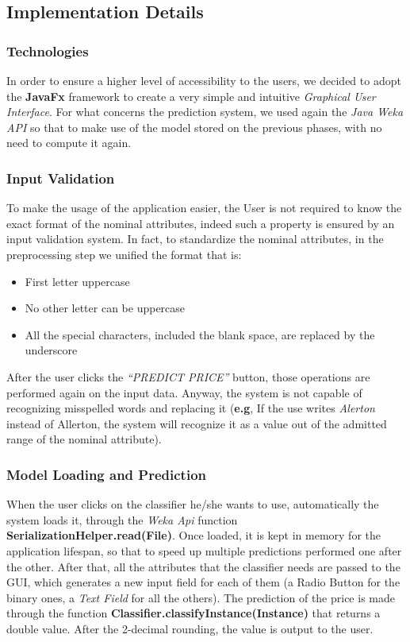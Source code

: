 \subsection{Implementation Details}
\subsubsection{Technologies}
In order to ensure a higher level of accessibility to the users, we decided to adopt the \textbf{JavaFx} framework to create a very simple and intuitive \textit{Graphical User Interface}. 
For what concerns the prediction system, we used again the \textit{Java Weka API} so that to make use of the model stored on the previous phases, with no need to compute it again.

\subsubsection{Input Validation}
To make the usage of the application easier, the User is not required to know the exact format of the nominal attributes, indeed such a property is ensured by an input validation system.
In fact, to standardize the nominal attributes, in the preprocessing step we unified the format that is:
\begin{itemize}
	\item First letter uppercase
	\item No other letter can be uppercase
	\item All the special characters, included the blank space, are replaced by the underscore
\end{itemize}

After the user clicks the \textit{“PREDICT PRICE”} button, those operations are performed again on the input data. Anyway, the system is not capable of recognizing misspelled words and replacing it (\textbf{e.g}, If the use writes \textit{Alerton} instead of Allerton, the system will recognize it as a value out of the admitted range of the nominal attribute).

\subsubsection{Model Loading and Prediction}
When the user clicks on the classifier he/she wants to use, automatically the system loads it, through the \textit{Weka Api} function \textbf{SerializationHelper.read(File)}. Once loaded, it is kept in memory for the application lifespan, so that to speed up multiple predictions performed one after the other. After that, all the attributes that the classifier needs are passed to the GUI, which generates a new input field for each of them (a Radio Button for the binary ones, a \textit{Text Field} for all the others). The prediction of the price is made through the function \textbf{Classifier.classifyInstance(Instance)} that returns a double value. After the 2-decimal rounding, the value is output to the user.
